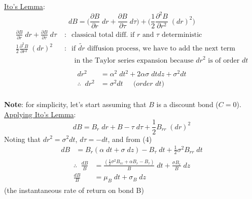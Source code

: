 \documentclass[
14pt,notheorems,hyperref={pdfauthor=whatever}
]{beamer}
\begin{document}
\begin{frame}
\underline{Ito's Lemma}:\\
\[ dB = \bigg(\frac{\partial B}{\partial r}\;dr + \frac{\partial B}{\partial \tau}\;d\tau\bigg) + \bigg(\frac{1}{2} \frac{\partial^2 B}{\partial r^2}\;(dr)^2\bigg)\]
\begin{align*}
    \frac{\partial B}{\partial r}\;dr + \frac{\partial B}{\partial \tau}\;d\tau \;&:\;\; \text{classical total diff. if $r$ and $\tau$ deterministic}\\
    \frac{1}{2} \frac{\partial^2 B}{\partial r^2}\;(dr)^2 \;&:\;\; \text{if $\tilde{dr}$ diffusion process, we have to add the next term}\\
    &\;\;\;\;\; \text{in the Taylor series expansion because $dr^2$ is of order $dt$}\\
\end{align*}
\begin{align*}
    dr^2 &= \alpha^2\;dt^2 + 2\alpha\sigma\;dtdz + \sigma^2dt\\
    \therefore \;\; dr^2 &= \sigma^2dt \;\;\;\; \textit{ (order $dt$)}\\
\end{align*}
\end{frame}

\begin{frame}
\textbf{Note}: for simplicity, let's start assuming that $B$ is a discount bond ($C=0$).\\
\hfill\break
\underline{Applying Ito's Lemma}:\\
\begin{equation} \tag{2}
    dB = B_r\;dr + B-\tau\;d\tau + \frac{1}{2} B_{rr}\;(dr)^2
\end{equation}
Noting that $dr^2 = \sigma^2dt$, $d\tau=-dt$, and from (4)
\begin{align*}
    dB &= B_r(\alpha\;dt+\sigma\;dz) - B_\tau\;dt + \frac{1}{2}\sigma^2 B_{rr}\;dt
\end{align*}
\begin{align*} \tag{3}
\begin{split}
    \therefore \;\; \frac{dB}{B} &= \frac{(\frac{1}{2}\sigma^2 B_{rr} + \alpha B_r - B_\tau)}{B}\;dt + \frac{\sigma B_r}{B}\;dz
    \\
    \frac{dB}{B} &= \mu_B\;dt + \sigma_B\;dz
\end{split}
\end{align*}
(the instantaneous rate of return on bond B) 
\end{frame}
\end{document}
